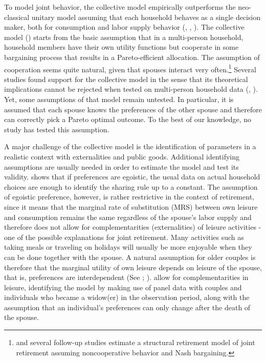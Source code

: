 \documentclass[11pt,letter]{article}
\begin{document}
\par To model joint behavior, the collective model empirically outperforms the neo-classical unitary model assuming that each household behaves as a single decision maker, both for consumption and labor supply behavior (\citet{fortin1997}, \citet{bourguignon1993}, \citet{cherchye2009}). The collective model (\citet{chiappori1988}) starts from the basic assumption that in a multi-person household, household members have their own utility functions but cooperate in some bargaining process that results in a Pareto-efficient allocation. The assumption of cooperation seems quite natural, given that spouses interact very often.\footnote{\citet{gustman2000retirement} and several follow-up studies estimate a structural retirement model of joint retirement assuming noncooperative behavior and Nash bargaining.} Several studies found support for the collective model in the sense that its theoretical implications cannot be rejected when tested on multi-person household data (\citet{chiappori2002}, \citet{cherchye2009}). Yet, some assumptions of that model remain untested. In particular, it is assumed that each spouse knows the preferences of the other spouse and therefore can correctly pick a Pareto optimal outcome. To the best of our knowledge, no study has tested this assumption.

\par A major challenge of the collective model is the identification of parameters in a realistic context with externalities and public goods. Additional identifying assumptions are usually needed in order to estimate the model and test its validity. \citet{chiappori1988,chiappori1992} shows that if preferences are egoistic, the usual data on actual household choices are enough to identify the sharing rule up to a constant. The assumption of egoistic preference, however, is rather restrictive in the context of retirement, since it means that the marginal rate of substitution (MRS) between own leisure and consumption remains the same regardless of the spouse's labor supply and therefore does not allow for complementarities (externalities) of leisure activities - one of the possible explanations for joint retirement. Many activities such as taking meals or traveling on holidays will usually be more enjoyable when they can be done together with the spouse. A natural assumption for older couples is therefore that the marginal utility of own leisure depends on leisure of the spouse, that is, preferences are interdependent (See \citet{gustman2000retirement,gustman2004,gustman2009}; \citet{michaud2011}). \citet{michaud2011} allow for complementarities in leisure,  identifying the model by making use of panel data with couples and individuals who became a widow(er) in the observation period, along with the assumption that an individual's preferences can only change after the death of the spouse.
\end{document}
